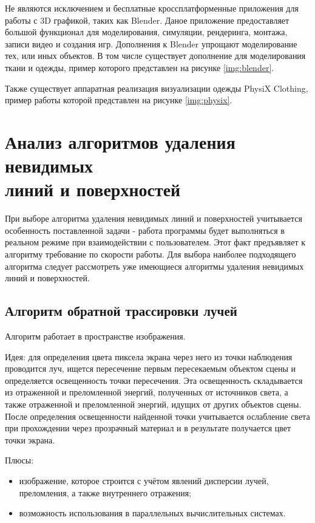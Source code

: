 Не являются исключением и бесплатные кроссплатформенные приложения для работы с
3D графикой, таких как Blender. Даное приложение предоставляет большой
функционал для моделирования, симуляции, рендеринга, монтажа, записи видео и
создания игр. Дополнения к Blender упрощают моделирование тех, или иных
объектов. В том числе существует дополнение для моделирования ткани и одежды,
пример которого представлен на рисунке \ref{img:blender}.


Также существует аппаратная реализация визуализации одежды PhysiX
Clothing\cite{site03}, пример работы которой представлен на рисунке
\ref{img:physix}.


\section{Анализ алгоритмов удаления невидимых\\линий и поверхностей}

При выборе алгоритма удаления невидимых линий и поверхностей учитывается
особенность поставленной задачи - работа программы будет выполняться в реальном
режиме при взаимодействии с пользователем. Этот факт предъявляет к алгоритму
требование по скорости работы. Для выбора наиболее подходящего алгоритма
следует рассмотреть уже имеющиеся алгоритмы удаления невидимых линий и
поверхностей.

\subsection{Алгоритм обратной трассировки лучей}
Алгоритм работает в пространстве изображения\cite{raytr}.

Идея: для определения цвета пиксела экрана через него из точки наблюдения
проводится луч, ищется пересечение первым пересекаемым объектом сцены и
определяется освещенность точки пересечения. Эта освещенность складывается из
отраженной и преломленной энергий, полученных от источников света, а также
отраженной и преломленной энергий, идущих от других объектов сцены. После
определения освещенности найденной точки учитывается ослабление света при
прохождении через прозрачный материал и в результате получается цвет точки
экрана.

Плюсы:
\begin{itemize}
    \item изображение, которое строится с учётом явлений дисперсии лучей,
        преломления, а также внутреннего отражения;
    \item возможность использования в параллельных вычислительных системах.
\end{itemize}

